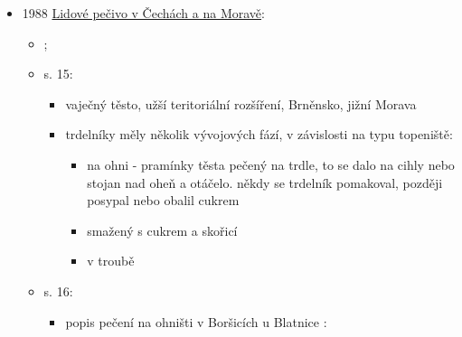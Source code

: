 \begin{itemize}
  \begin{itemize}
  \tightlist
  \item
    článek: \emph{Tendence vývoje sváteční stravy v Brně od počátku 20.
    století}, 
  \item
    s. 96: masopustní pečivo: trdelníky a boží milosti během 20. a
    hlavně 30. let zanikly, koblihy se smažily ve většině rodin
  \item
    s. 97: v první polovině 20. století zanikly mnohé archaické složky
    lidové stravy, třeba velikonoční jidáše, nádivka, pak masopustní
    trdelníky a boží milosti, nověji i koblihy jako typicky masopustní
    jídlo
  \end{itemize}
\item
  1988
  \href{https://ceskadigitalniknihovna.cz/uuid/uuid:0a416360-305d-11e9-844c-005056827e51}{Lidové
  pečivo v Čechách a na Moravě}:

  \begin{itemize}
  \tightlist
  \item
     ; 
  \item
    s. 15:

    \begin{itemize}
    \tightlist
    \item
      vaječný těsto, užší teritoriální rozšíření, Brněnsko, jižní Morava
    \item
      trdelníky měly několik vývojových fází, v závislosti na typu
      topeniště:

      \begin{itemize}
      \tightlist
      \item
        na ohni - pramínky těsta pečený na trdle, to se dalo na cihly
        nebo stojan nad oheň a otáčelo. někdy se trdelník pomakoval,
        později posypal nebo obalil cukrem
      \item
        smažený s cukrem a skořicí
      \item
        v troubě
      \end{itemize}
    \end{itemize}
  \item
    s. 16:

    \begin{itemize}
    \tightlist
    \item
      popis pečení na ohništi v Boršicích u Blatnice
       :


\end{itemize}
\end{itemize}
\end{itemize}
